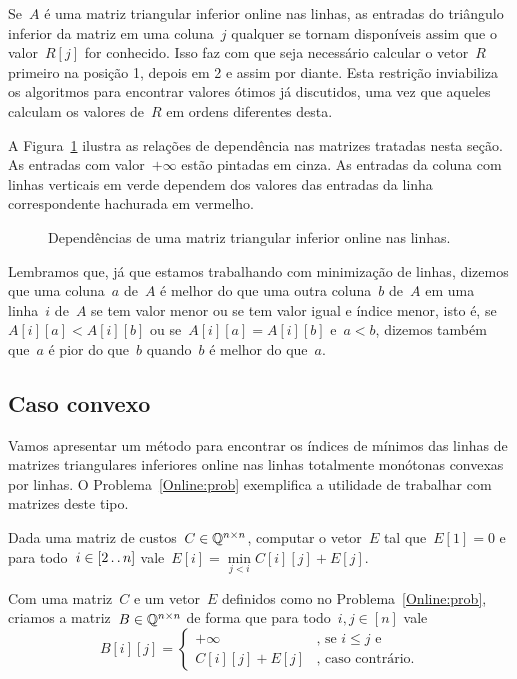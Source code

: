 Se~$A$ é uma matriz triangular inferior online nas linhas, as entradas do triângulo inferior da matriz em uma coluna~$j$ qualquer se tornam disponíveis assim que o valor~$R[j]$ for conhecido. Isso faz com que seja necessário calcular o vetor~$R$ primeiro na posição 1, depois em 2 e assim por diante. Esta restrição inviabiliza os algoritmos para encontrar valores ótimos já discutidos, uma vez que aqueles calculam os valores de~$R$ em ordens diferentes desta.

A Figura~\ref{Online:matrix:fig} ilustra as relações de dependência nas matrizes tratadas nesta seção. As entradas com valor~$+\infty$ estão pintadas em cinza. As entradas da coluna com linhas verticais em verde dependem dos valores das entradas da linha correspondente hachurada em vermelho. 

\begin{figure}[h]
    \centering
    
    \caption{Dependências de uma matriz triangular inferior online nas linhas.} \label{Online:matrix:fig}
\end{figure}

Lembramos que, já que estamos trabalhando com minimização de linhas, dizemos que uma coluna~$a$ de~$A$ é melhor do que uma outra coluna~$b$ de~$A$ em uma linha~$i$ de~$A$ se tem valor menor ou se tem valor igual e índice menor, isto é, se~$A[i][a] < A[i][b]$ ou se~$A[i][a] = A[i][b]$ e~$a < b$, dizemos também que~$a$ é pior do que~$b$ quando~$b$ é melhor do que~$a$.


\subsection{Caso convexo}

Vamos apresentar um método para encontrar os índices de mínimos das linhas de matrizes triangulares inferiores online nas linhas totalmente monótonas convexas por linhas. O Problema~\ref{Online:prob} exemplifica a utilidade de trabalhar com matrizes deste tipo.

\begin{prob} \label{Online:prob}
Dada uma matriz de custos~$C \in \mathbb{Q}^{n \times n}$, computar o vetor~$E$ tal que~$E[1] = 0$ e para todo~$i \in [2 \,.\,.\, n]$ vale~$E[i] = \min\limits_{j < i} C[i][j] + E[j]$.
\end{prob}

Com uma matriz~$C$ e um vetor~$E$ definidos como no Problema~\ref{Online:prob}, criamos a matriz~$B \in \mathbb{Q}^{n \times n}$ de forma que para todo~$i,j \in [n]$ vale
\begin{equation} \label{Online:Bmat}
    B[i][j] = \begin{cases}
        +\infty & \text{, se } i \leq j \text{ e } \\
        C[i][j] + E[j]    & \text{, caso contrário.}
    \end{cases}
\end{equation}

